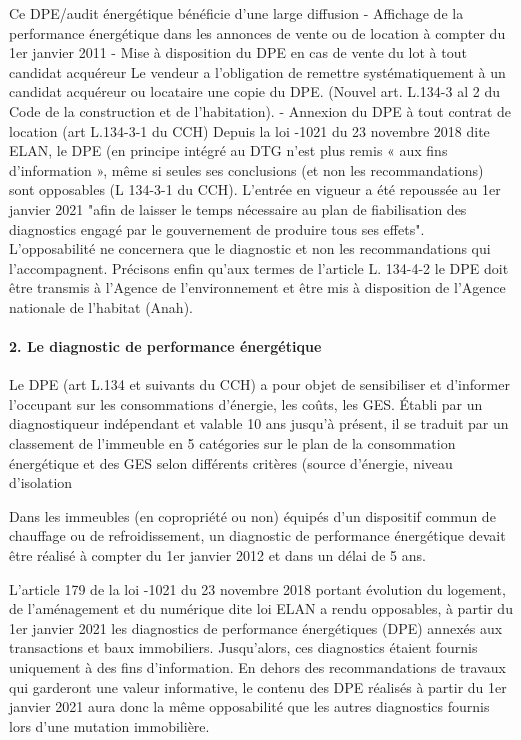 			Ce DPE/audit énergétique bénéficie d’une large diffusion
			- Affichage de la performance énergétique dans les annonces de vente ou de location à compter du 1er janvier 2011
			- Mise à disposition du DPE en cas de vente du lot à tout candidat acquéreur
			Le vendeur a l’obligation de remettre systématiquement à un candidat acquéreur ou locataire une copie du DPE. (Nouvel art. L.134-3 al 2 du Code de la construction et de l’habitation).
			- Annexion du DPE à tout contrat de location (art L.134-3-1 du CCH)
			Depuis la loi -1021 du 23 novembre 2018 dite ELAN, le DPE (en principe intégré au DTG n’est plus remis « aux fins d’information », même si seules ses conclusions (et non les recommandations) sont opposables (L 134-3-1 du CCH). L’entrée en vigueur a été repoussée au 1er janvier 2021 "afin de laisser le temps nécessaire au plan de fiabilisation des diagnostics engagé par le gouvernement de produire tous ses effets". L'opposabilité ne concernera que le diagnostic et non les recommandations qui l'accompagnent.
			Précisons enfin qu’aux termes de l’article L. 134-4-2 le DPE doit être transmis à l’Agence de l’environnement et être mis à disposition de l’Agence nationale de l’habitat (Anah).
		
		\paragraph{2. Le diagnostic de performance énergétique}
		
			Le DPE (art L.134 et suivants du CCH) a pour objet de sensibiliser et d’informer l’occupant sur les consommations d’énergie, les coûts, les GES. Établi par un diagnostiqueur indépendant et valable 10 ans jusqu’à présent, il se traduit par un classement de l’immeuble en 5 catégories sur le plan de la consommation énergétique et des GES selon différents critères (source d’énergie, niveau d’isolation
			
			Dans les immeubles (en copropriété ou non) équipés d’un dispositif commun de chauffage ou de refroidissement, un diagnostic de performance énergétique devait être réalisé à compter du 1er janvier 2012 et dans un délai de 5 ans.
			
			L’article 179 de la loi -1021 du 23 novembre 2018 portant évolution du logement, de l’aménagement et du numérique dite loi ELAN a rendu opposables, à partir du 1er janvier 2021 les diagnostics de performance énergétiques (DPE) annexés aux transactions et baux immobiliers. Jusqu’alors, ces diagnostics étaient fournis uniquement à des fins d’information. En dehors des recommandations de travaux qui garderont une valeur informative, le contenu des DPE réalisés à partir du 1er janvier 2021 aura donc la même opposabilité que les autres diagnostics fournis lors d’une mutation immobilière.
			
